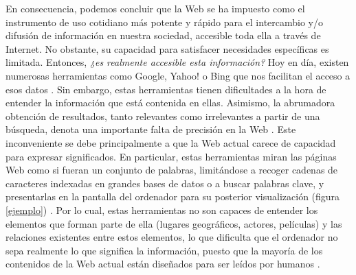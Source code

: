 



En consecuencia, podemos concluir que la Web se ha impuesto como el instrumento de uso cotidiano más potente y rápido para el intercambio y/o difusión de información en nuestra sociedad, accesible toda ella a través de Internet. No obstante, su capacidad para satisfacer necesidades específicas es limitada. Entonces, \textit{¿es realmente accesible esta información?} Hoy en día, existen numerosas herramientas como Google, Yahoo! o Bing que nos facilitan el acceso a esos datos \cite{semantica-web}. Sin embargo, estas herramientas tienen dificultades a la hora de entender la información que está contenida en ellas. Asimismo, la abrumadora obtención de resultados, tanto relevantes como irrelevantes a partir de una búsqueda, denota una importante falta de precisión en la Web \cite{coursera}. Este inconveniente se debe principalmente a que la Web actual carece de capacidad para expresar significados. En particular, estas herramientas miran las páginas Web como si fueran un conjunto de palabras, limitándose a recoger cadenas de caracteres indexadas en grandes bases de datos o a buscar palabras clave, y presentarlas en la pantalla del ordenador para su posterior visualización (figura \ref{ejemplo}) \cite{web-semantica-w3c}. Por lo cual, estas herramientas no son capaces de entender los elementos que forman parte de ella (lugares geográficos, actores, películas) y las relaciones existentes entre estos elementos, lo que dificulta que el ordenador no sepa realmente lo que significa la información, puesto que la mayoría de los contenidos de la Web actual están diseñados para ser leídos por humanos \cite{apuntes-clase-jose}. \\

